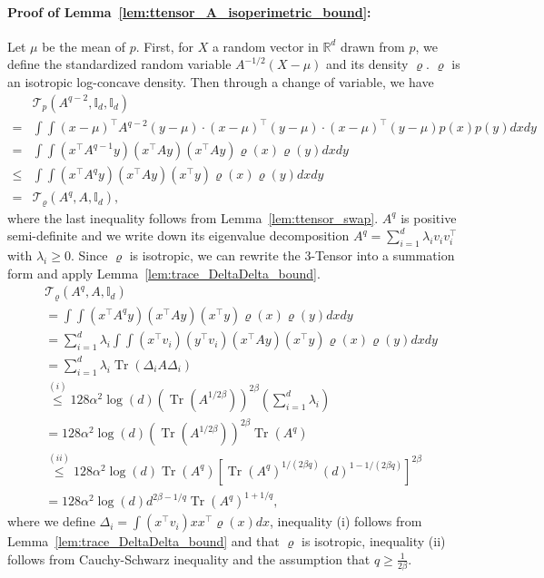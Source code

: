 \documentclass[11pt,twoside]{article}
\newcommand{\denb}{\varrho}
\newcommand{\ttensor}{\mathcal{T}}
\theoremstyle{named}
\theoremstyle{plain}
\newcommand{\usedim}{\ensuremath{d}}
\newcommand{\dims}{\usedim}
\DeclareMathOperator{\trace}{Tr}
\newcommand{\Ind}{\ensuremath{\mathbb{I}}}
\newcommand{\real}{\ensuremath{\mathbb{R}}}
\newcommand{\brackets}[1]{\left[ #1 \right]}
\newcommand{\parenth}[1]{\left( #1 \right)}
\newcommand{\tp}{^\top}
\begin{document}
\paragraph{Proof of Lemma~\ref{lem:ttensor_A_isoperimetric_bound}:} Let $\mu$ be the mean of $p$. First, for $X$ a random vector in $\real^\dims$ drawn from $p$, we define the standardized random variable $A^{-1/2} (X - \mu)$ and its density $\denb$. $\denb$ is an isotropic log-concave density. Then through a change of variable, we have
\begin{align*}
  &\ttensor_p \parenth{A^{q-2}, \Ind_\dims, \Ind_\dims} \\
  =& \int\int (x-\mu)\tp A^{q-2} (y-\mu) \cdot (x-\mu)\tp (y-\mu) \cdot (x-\mu) \tp (y-\mu) p(x) p(y) dx dy \\
  =& \int\int \parenth{x\tp A^{q-1} y} (x\tp A y) (x \tp A y) \denb(x) \denb(y) dx dy \\
  \leq& \int\int \parenth{x\tp A^{q} y} (x\tp A y) (x \tp y) \denb(x) \denb(y) dx dy \\
  =& \ttensor_\denb \parenth{A^{q}, A, \Ind_\dims},
\end{align*}
where the last inequality follows from Lemma~\ref{lem:ttensor_swap}. $A^q$ is positive semi-definite and we write down its eigenvalue decomposition $A^q =  \sum_{i=1}^\dims \lambda_i v_i v_i \tp$ with $\lambda_i \geq 0$. Since $\denb$ is isotropic, we can rewrite the 3-Tensor into a summation form and apply Lemma~\ref{lem:trace_DeltaDelta_bound}.
\begin{align*}
  &\ttensor_\denb \parenth{A^{q}, A, \Ind_\dims} \\
  & = \int \int \parenth{x \tp A^q y} \parenth{x \tp A y} \parenth{x\tp y} \denb(x) \denb(y) dx dy  \\
  & = \sum_{i=1}^\dims \lambda_i \int \int \parenth{x \tp v_i} \parenth{y \tp v_i} \parenth{x \tp A y} \parenth{x\tp y} \denb(x) \denb(y) dx dy  \\
  & = \sum_{i=1}^\dims \lambda_i \trace\parenth{\Delta_i A \Delta_i} \\
  &\stackrel{(i)}{\leq}  128 \alpha^2 \log(\dims) \parenth{\trace(A^{1/2\beta})}^{2\beta} \parenth{\sum_{i=1}^\dims \lambda_i} \\
  &= 128 \alpha^2 \log(\dims) \parenth{\trace(A^{1/2\beta})}^{2\beta} \trace(A^q) \\
  &\stackrel{(ii)}{\leq} 128 \alpha^2 \log(\dims) \trace(A^q) \brackets{\trace\parenth{A^q}^{1/(2\beta q)} \parenth{\dims}^{1 - 1/(2\beta q)}}^{2\beta} \\
  &= 128 \alpha^2 \log(\dims) \dims^{2\beta - 1/q} \trace(A^q) ^{1 + 1/q},
\end{align*}
where we define $\Delta_i = \int (x\tp v_i) x x\tp \varrho(x) dx$, inequality (i) follows from Lemma~\ref{lem:trace_DeltaDelta_bound} and that $\varrho$ is isotropic, inequality (ii) follows from Cauchy-Schwarz inequality and the assumption that $q \geq \frac{1}{2\beta}$.
\end{document}
